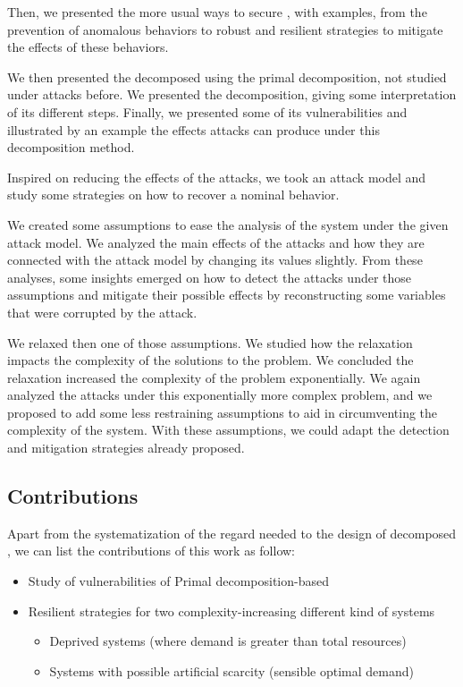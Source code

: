 \documentclass[../main.tex]{subfiles}
\begin{document}
Then, we presented the more usual ways to secure \cps{}, with examples, from the prevention of anomalous behaviors to robust and resilient strategies to mitigate the effects of these behaviors.

We then presented the \mpc{} decomposed using the primal decomposition, not studied under attacks before.
We presented the decomposition, giving some interpretation of its different steps.
Finally, we presented some of its vulnerabilities and illustrated by an example the effects attacks can produce under this decomposition method.

Inspired on reducing the effects of the attacks, we took an attack model and study some strategies on how to recover a nominal behavior.

We created some assumptions to ease the analysis of the system under the given attack model.
We analyzed the main effects of the attacks and how they are connected with the attack model by changing its values slightly.
From these analyses, some insights emerged on how to detect the attacks under those assumptions and mitigate their possible effects by reconstructing some variables that were corrupted by the attack.

We relaxed then one of those assumptions.
We studied how the relaxation impacts the complexity of the solutions to the problem.
We concluded the relaxation increased the complexity of the problem exponentially.
We again analyzed the attacks under this exponentially more complex problem, and we proposed to add some less restraining assumptions to aid in circumventing the complexity of the system.
With these assumptions, we could adapt the detection and mitigation strategies already proposed.


\subsection{Contributions}
Apart from the systematization of the regard needed to the design of decomposed \cps{}, we can list the contributions of this work as follow:
\begin{itemize}
  \item Study of vulnerabilities of Primal decomposition-based \dmpc{}
  \item Resilient strategies for two complexity-increasing different kind of systems
        \begin{itemize}
          \item Deprived systems (where demand is greater than total resources)
          \item Systems with possible artificial scarcity (sensible optimal demand)
        \end{itemize}
\end{itemize}
\end{document}
